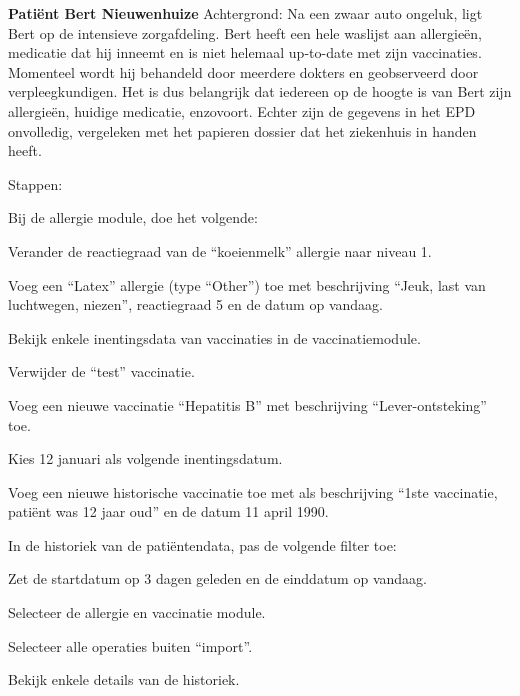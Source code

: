     \noindent\textbf{Pati\"{e}nt Bert Nieuwenhuize}\newline
    Achtergrond: Na een zwaar auto ongeluk, ligt Bert op de intensieve zorgafdeling. Bert heeft een hele waslijst aan allergie\"{e}n, medicatie dat hij inneemt en is niet helemaal up-to-date met zijn vaccinaties. Momenteel wordt hij behandeld door meerdere dokters en geobserveerd door verpleegkundigen. Het is dus belangrijk dat iedereen op de hoogte is van Bert zijn allergie\"{e}n, huidige medicatie, enzovoort. Echter zijn de gegevens in het EPD onvolledig, vergeleken met het papieren dossier dat het ziekenhuis in handen heeft.\medskip

    \noindent Stappen:
    \vspace{-6pt}
    \begin{myenumerate}
        \item Bij de allergie module, doe het volgende:
        \begin{myenumerate}
            \item Verander de reactiegraad van de ``koeienmelk'' allergie naar niveau 1.
            \item Voeg een ``Latex'' allergie (type ``Other'') toe met beschrijving ``Jeuk, last van luchtwegen, niezen'', reactiegraad 5 en de datum op vandaag.
        \end{myenumerate}
        \item Bekijk enkele inentingsdata van vaccinaties in de vaccinatiemodule.
        \begin{myenumerate}
            \item Verwijder de ``test'' vaccinatie.
            \item Voeg een nieuwe vaccinatie ``Hepatitis B''  met beschrijving ``Lever-ontsteking'' toe.
            \begin{myenumerate}
                \item Kies 12 januari als volgende inentingsdatum.
                \item Voeg een nieuwe historische vaccinatie toe met als beschrijving ``1ste vaccinatie, pati\"{e}nt was 12 jaar oud'' en de datum 11 april 1990.
            \end{myenumerate}
        \end{myenumerate}
        \item In de historiek van de pati\"{e}ntendata, pas de volgende filter toe:
        \begin{myenumerate}
            \item Zet de startdatum op 3 dagen geleden en de einddatum op vandaag.
            \item Selecteer de allergie en vaccinatie module.
            \item Selecteer alle operaties buiten ``import''.
            \item Bekijk enkele details van de historiek.
        \end{myenumerate}
    \end{myenumerate}

